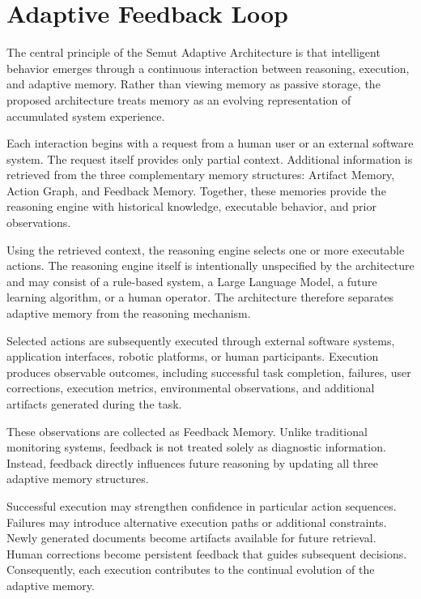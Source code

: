\section{Adaptive Feedback Loop}
\label{sec:adaptive-loop}

The central principle of the Semut Adaptive Architecture is that intelligent behavior emerges through a continuous interaction between reasoning, execution, and adaptive memory. Rather than viewing memory as passive storage, the proposed architecture treats memory as an evolving representation of accumulated system experience.

Each interaction begins with a request from a human user or an external software system. The request itself provides only partial context. Additional information is retrieved from the three complementary memory structures: Artifact Memory, Action Graph, and Feedback Memory. Together, these memories provide the reasoning engine with historical knowledge, executable behavior, and prior observations.

Using the retrieved context, the reasoning engine selects one or more executable actions. The reasoning engine itself is intentionally unspecified by the architecture and may consist of a rule-based system, a Large Language Model, a future learning algorithm, or a human operator. The architecture therefore separates adaptive memory from the reasoning mechanism.

Selected actions are subsequently executed through external software systems, application interfaces, robotic platforms, or human participants. Execution produces observable outcomes, including successful task completion, failures, user corrections, execution metrics, environmental observations, and additional artifacts generated during the task.

These observations are collected as Feedback Memory. Unlike traditional monitoring systems, feedback is not treated solely as diagnostic information. Instead, feedback directly influences future reasoning by updating all three adaptive memory structures.

Successful execution may strengthen confidence in particular action sequences. Failures may introduce alternative execution paths or additional constraints. Newly generated documents become artifacts available for future retrieval. Human corrections become persistent feedback that guides subsequent decisions. Consequently, each execution contributes to the continual evolution of the adaptive memory.

